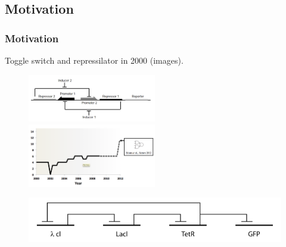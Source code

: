 \documentclass{beamer}
\begin{document}

\subsection{Motivation}

\begin{frame}
\frametitle{Motivation}

Toggle switch and repressilator in 2000 (images).
 
\begin{figure}[ht]
  \includegraphics[width=0.5\textwidth]{DNA_toggle.png}
  \hfill
  \includegraphics[width=0.5\textwidth]{circuit_complexity.png}
\end{figure}

\begin{figure}[ht]
  \includegraphics[scale=0.4]{repressilator.png}
\end{figure}
\end{frame}
\end{document}
